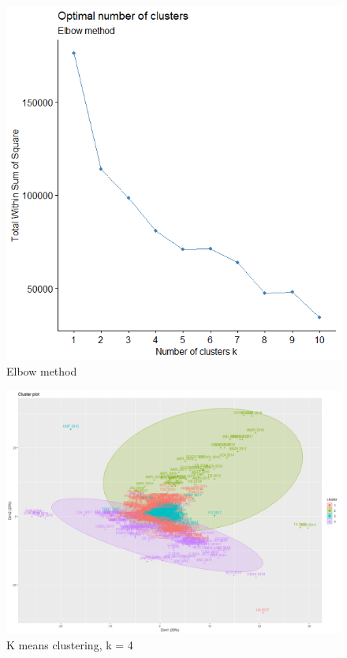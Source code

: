\documentclass[11pt,]{article}
\begin{document}
\begin{figure}
\includegraphics[width=1\linewidth,height=0.7\textheight]{unsupervised_elbow} \caption{Elbow method}\label{fig:elbow}
\end{figure}

\begin{figure}
\includegraphics[width=1\linewidth,height=0.7\textheight]{cluster_image} \caption{K means clustering, k = 4}\label{fig:cluster}
\end{figure}
\end{document}
